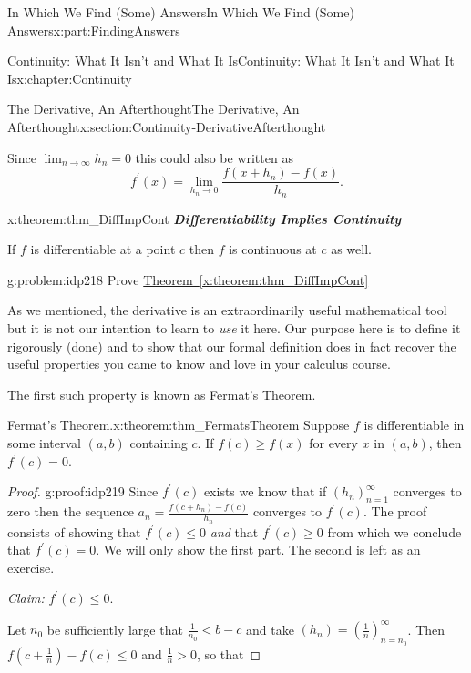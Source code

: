 \documentclass[oneside,10pt,]{book}
\newcommand{\xreffont}{\relax}
\newcommand{\alert}[1]{\textbf{\textit{#1}}}
\numberwithin{equation}{section}
\def\limit#1#2#3{{\displaystyle\lim_{#1\rightarrow #2}#3}}
\newcommand{\lt}{<}
\begin{document}
\begin{partptx}{In Which We Find (Some) Answers}{}{In Which We Find (Some) Answers}{}{}{x:part:FindingAnswers}
\begin{chapterptx}{Continuity: What It Isn't and What It Is}{}{Continuity: What It Isn't and What It Is}{}{}{x:chapter:Continuity}
\begin{sectionptx}{The Derivative, An Afterthought}{}{The Derivative, An Afterthought}{}{}{x:section:Continuity-DerivativeAfterthought}
\begin{enumerate}
\begin{equation*}
\end{equation*}
Since \(\limit{n}{\infty}{h_n}=0\) this could also be written as%
\begin{equation*}
f^\prime{(x)} = \limit{h_n}{0}{\frac{f(x+h_n)-f(x)}{h_n}}\text{.}
\end{equation*}
%
\end{enumerate}
%
\begin{theorem}{}{}{x:theorem:thm_DiffImpCont}%
%
%
\alert{Differentiability Implies Continuity}%
\par
If \(f\) is differentiable at a point \(c\) then \(f\) is continuous at \(c\) as well.%
\end{theorem}
\begin{problem}{}{g:problem:idp218}%
Prove \hyperref[x:theorem:thm_DiffImpCont]{Theorem~{\xreffont\ref{x:theorem:thm_DiffImpCont}}}%
\end{problem}
As we mentioned, the derivative is an extraordinarily useful mathematical tool but it is not our intention to learn to \emph{use} it here.  Our purpose here is to define it rigorously (done) and to show that our formal definition does in fact recover the useful properties you came to know and love in your calculus course.%
\par
The first such property is known as Fermat's Theorem.%
\begin{theorem}{Fermat's Theorem.}{}{x:theorem:thm_FermatsTheorem}%
%
Suppose \(f\) is differentiable in some interval \((a,b)\) containing \(c\).  If \(f(c)\ge f(x)\) for every \(x\) in \((a,b)\), then \(f^\prime(c)=0\).%
\end{theorem}
\begin{proof}{}{g:proof:idp219}
Since \(f^\prime(c)\) exists we know that if \(\left(h_n\right)_{n=1}^\infty\) converges to zero then the sequence \(a_n = \frac{f\left(c+h_n\right)-f(c)}{h_n}\) converges to \(f^\prime(c)\).  The proof consists of showing that \(f^\prime(c)\leq 0\) \emph{and} that \(f^\prime(c)\geq 0\) from which we conclude that \(f^\prime(c)= 0\).  We will only show the first part.  The second is left as an exercise.%
\par
\emph{Claim:} \(f^\prime(c)\leq 0\).%
\par
Let \(n_0\) be sufficiently large that \(\frac{1}{n_0}\lt b-c\) and take \(\left(h_n\right)=\left(\frac{1}{n}\right)_{n=n_0}^\infty\).  Then \(f\left(c+\frac1n\right)-f(c) \leq 0\) and \(\frac1n>0\), so that%

\end{proof}
\end{sectionptx}
\end{chapterptx}
\end{partptx}
\end{document}
